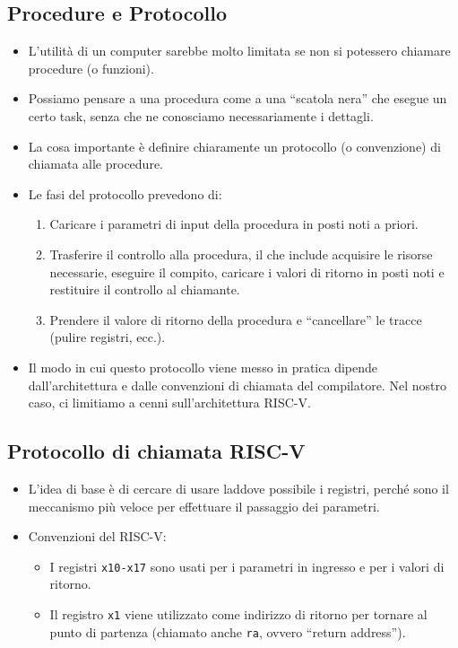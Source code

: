 \documentclass[12pt, a4paper]{article}
\begin{document}
\subsection{Procedure e Protocollo}
\begin{itemize}
    \item L'utilità di un computer sarebbe molto limitata se non si potessero chiamare procedure (o funzioni).
    \item Possiamo pensare a una procedura come a una ``scatola nera'' che esegue un certo task, senza che ne conosciamo necessariamente i dettagli.
    \item La cosa importante è definire chiaramente un protocollo (o convenzione) di chiamata alle procedure.
    \item Le fasi del protocollo prevedono di:
    \begin{enumerate}
        \item Caricare i parametri di input della procedura in posti noti a priori.
        \item Trasferire il controllo alla procedura, il che include acquisire le risorse necessarie, eseguire il compito, caricare i valori di ritorno in posti noti e restituire il controllo al chiamante.
        \item Prendere il valore di ritorno della procedura e ``cancellare'' le tracce (pulire registri, ecc.).
    \end{enumerate}
    \item Il modo in cui questo protocollo viene messo in pratica dipende dall'architettura e dalle convenzioni di chiamata del compilatore. Nel nostro caso, ci limitiamo a cenni sull'architettura RISC-V.
\end{itemize}

\subsection{Protocollo di chiamata RISC-V}
\begin{itemize}
    \item L'idea di base è di cercare di usare laddove possibile i registri, perché sono il meccanismo più veloce per effettuare il passaggio dei parametri.
    \item Convenzioni del RISC-V:
    \begin{itemize}
        \item I registri \texttt{x10-x17} sono usati per i parametri in ingresso e per i valori di ritorno.
        \item Il registro \texttt{x1} viene utilizzato come indirizzo di ritorno per tornare al punto di partenza (chiamato anche \texttt{ra}, ovvero ``return address'').
    \end{itemize}
\end{itemize}
\end{document}
